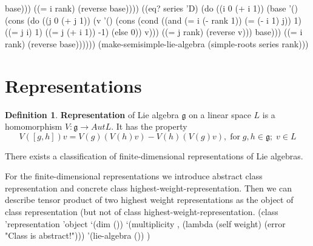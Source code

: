 \documentclass[a4paper,10pt]{article}%
\theoremstyle{definition} \newtheorem{Def}{Definition}
\begin{document}
                       base)))
               ((= i rank) (reverse base))))
          ((eq? series 'D)
           (do ((i 0 (+ i 1))
                (base '()
                      (cons 
                       (do ((j 0 (+ j 1))
                            (v '()
                               (cons
                                (cond ((and (= i (- rank 1)) (= (- i 1) j)) 1)
                                      ((= j i) 1)
                                      ((= j (+ i 1)) -1)
                                      (else 0))
                                v)))
                           ((= j rank) (reverse v)))
                       base)))
               ((= i rank) (reverse base))))))
  (make-semisimple-lie-algebra (simple-roots series rank)))
\nwendcode{}\nwdocspar
\section{Representations}
\label{sec:representations}

\begin{Def}
  {\bf Representation} of Lie algebra $\mathfrak{g}$ on a linear space $L$ is a homomorphism $V:\mathfrak{g}\to Aut L$. It has the property
  \begin{equation}
    \label{eq:3}
    V([g,h])v=V(g)(V(h)v)-V(h)(V(g)v), \;\text{for}\; g,h\in \mathfrak{g};\; v\in L
  \end{equation}
\end{Def}
There exists a classification of finite-dimensional representations of Lie algebras.

For the finite-dimensional representations we introduce abstract class {\Tt{}representation\nwendquote} and concrete class {\Tt{}highest-weight-representation\nwendquote}. Then we can describe  tensor product of two highest weight representations as the object of class {\Tt{}representation\nwendquote} (but not of class {\Tt{}highest-weight-representation\nwendquote}.
\nwenddocs{}\endmoddef\nwstartdeflinemarkup{}\nwenddeflinemarkup
(class 'representation 'object
       `(dim ())
       `(multiplicity , (lambda (self weight)
                          (error "Class is abstract!")))
       '(lie-algebra ())
       )
\nwendcode{}\nwdocspar
\end{document}
